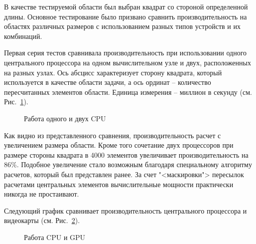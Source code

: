 \documentclass[a4paper, 14pt]{extarticle}
\theoremstyle{definition}
\begin{document}
\par В качестве тестируемой области был выбран квадрат со стороной определенной длины. Основное тестирование было призвано сравнить производительность на областях различных размеров с использованием разных типов устройств и их комбинаций.

\par Первая серия тестов сравнивала производительность при использовании одного центрального процессора на одном вычислительном узле и двух, расположенных на разных узлах. Ось абсцисс характеризует сторону квадрата, который используется в качестве области задачи, а ось ординат -- количество пересчитанных элементов области. Единица измерения -- миллион в секунду (см. Рис.~\ref{ris:cpu_1_2}).
\begin{figure}[h]
	\caption{Работа одного и двух CPU}
	\label{ris:cpu_1_2}
\end{figure}

\par Как видно из представленного сравнения, производительность расчет с увеличением размера области. Кроме того сочетание двух процессоров при размере стороны квадрата в 4000 элементов увеличивает производительность на 86\%. Подобное увеличение стало возможным благодаря специальному алгоритму расчетов, который был представлен ранее. За счет "<маскировки"> пересылок расчетами центральных элементов вычислительные мощности практически никогда не простаивают.

\par Следующий график сравнивает производительность центрального процессора и видеокарты (см. Рис.~\ref{ris:cpu_1_gpu_1}).
\begin{figure}[h]
	\caption{Работа CPU и GPU}
	\label{ris:cpu_1_gpu_1}
\end{figure}
\end{document}
